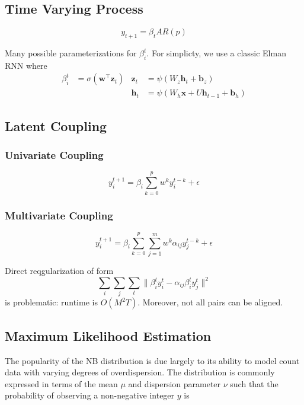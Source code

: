 \documentclass{article}
\renewcommand{\vec}[1]{\bm{#1}}
\begin{document}
\subsection{Time Varying Process}
\label{sec:org55ef7a0}
\begin{equation*}
    y_{t+1} = \beta_t AR(p)
\end{equation*}

Many possible parameterizations for \(\beta_i^t\). For simplicty, we use a classic Elman RNN
where
\begin{align*}
    \beta_i^t & = \sigma(\vec{w}^\top \vec{z}_t)
    & \vec{z}_t & = \psi(W_z\vec{h}_t + \vec{b}_z) \\
    && \vec{h}_t & = \psi(W_h\vec{x} + U\vec{h}_{t-1} + \vec{b}_h)
\end{align*}

\subsection{Latent Coupling}
\label{sec:org5c315f5}

\subsubsection{Univariate Coupling}
\label{sec:org287edf9}
\begin{equation}
    y_i^{t+1} = \beta_i \sum_{k=0}^p w^k y_i^{t-k} + \epsilon
\end{equation}

\subsubsection{Multivariate Coupling}
\label{sec:orgf764c4f}
\begin{equation}
    y_i^{t+1} = \beta_i \sum_{k=0}^p \sum_{j=1}^m w^k \alpha_{ij} y_j^{t-k} + \epsilon
\end{equation}

Direct reqgularization of form
\begin{equation*}
    \sum_i\sum_j\sum_t\|\beta_i^t y_i^t - \alpha_{ij}\beta_i^t y_j^t\|^2
\end{equation*}
is problematic: runtime is \(O(M^2T)\). Moreover, not all pairs can be aligned.



\subsection{Maximum Likelihood Estimation}
\label{sec:orgc6d14df}
The popularity of the NB distribution is due largely to its ability to model
count data with varying degrees of overdispersion. The distribution is commonly
expressed in terms of the mean \(\mu\) and dispersion parameter \(\nu\) such that the
probability of observing a non-negative integer \(y\) is
\end{document}
